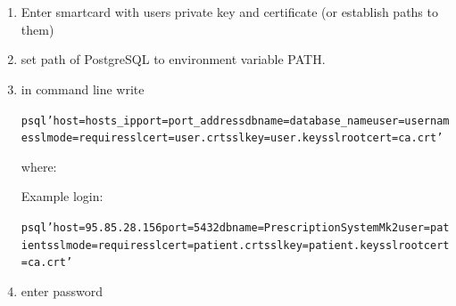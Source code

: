 \section{}\label{sec:login}
\begin{enumerate}
\item Enter smartcard with users private key and certificate (or establish paths to them)
\item set path of PostgreSQL to environment variable PATH.
\item in command line write\small
\begin{alltt}psql 'host=hosts_ip port=port\_address dbname=database\_name \newline user=username sslmode=require sslcert=user.crt sslkey=user.key \newline sslrootcert=ca.crt'\end{alltt}\normalsize where:
\small

	Example login: 
\begin{alltt}psql 'host=95.85.28.156 port=5432 dbname=PrescriptionSystemMk2 \newline user=patient sslmode=require sslcert=patient.crt sslkey=patient.key \newline sslrootcert=ca.crt'\end{alltt}
\normalsize
\item enter password
\end{enumerate}

